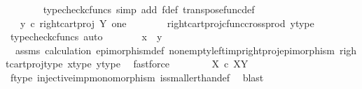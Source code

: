 \begin{isabellebody}
\ \ \ \ \ \ \isamarkupfalse%
\ {\isacharparenleft}{\kern0pt}typecheck{\isacharunderscore}{\kern0pt}cfuncs{\isacharcomma}{\kern0pt}\ simp\ add{\isacharcolon}{\kern0pt}\ f{\isacharunderscore}{\kern0pt}def\ transpose{\isacharunderscore}{\kern0pt}func{\isacharunderscore}{\kern0pt}def{\isacharparenright}{\kern0pt}\isanewline
\ \ \ \ \isamarkupfalse%
\ \isamarkupfalse%
\ {\isachardoublequoteopen}{\isachardot}{\kern0pt}{\isachardot}{\kern0pt}{\isachardot}{\kern0pt}\ {\isacharequal}{\kern0pt}\ y\ {\isasymcirc}\isactrlsub c\ {\isacharparenleft}{\kern0pt}right{\isacharunderscore}{\kern0pt}cart{\isacharunderscore}{\kern0pt}proj\ Y\ one{\isacharparenright}{\kern0pt}{\isachardoublequoteclose}\isanewline
\ \ \ \ \ \ \isamarkupfalse%
\ right{\isacharunderscore}{\kern0pt}cart{\isacharunderscore}{\kern0pt}proj{\isacharunderscore}{\kern0pt}cfunc{\isacharunderscore}{\kern0pt}cross{\isacharunderscore}{\kern0pt}prod\ y{\isacharunderscore}{\kern0pt}type{}\ \isamarkupfalse%
\ {\isacharparenleft}{\kern0pt}typecheck{\isacharunderscore}{\kern0pt}cfuncs{\isacharcomma}{\kern0pt}\ auto{\isacharparenright}{\kern0pt}\isanewline
\ \ \ \ \isamarkupfalse%
\ \isamarkupfalse%
\ {\isachardoublequoteopen}x\ {\isacharequal}{\kern0pt}\ y{\isachardoublequoteclose}\isanewline
\ \ \ \ \ \ \isamarkupfalse%
\ \ assms\ calculation\ epimorphism{\isacharunderscore}{\kern0pt}def{}\ nonempty{\isacharunderscore}{\kern0pt}left{\isacharunderscore}{\kern0pt}imp{\isacharunderscore}{\kern0pt}right{\isacharunderscore}{\kern0pt}proj{\isacharunderscore}{\kern0pt}epimorphism\ right{\isacharunderscore}{\kern0pt}cart{\isacharunderscore}{\kern0pt}proj{\isacharunderscore}{\kern0pt}type\ x{\isacharunderscore}{\kern0pt}type{}\ y{\isacharunderscore}{\kern0pt}type{}\ \isamarkupfalse%
\ fastforce\isanewline
\ \ \isamarkupfalse%
\isanewline
\ \ \isamarkupfalse%
\ \isamarkupfalse%
\ {\isachardoublequoteopen}X\ {\isasymle}\isactrlsub c\ X\isactrlbsup Y\isactrlesup {\isachardoublequoteclose}\isanewline
\ \ \ \ \isamarkupfalse%
\ f{\isacharunderscore}{\kern0pt}type\ injective{\isacharunderscore}{\kern0pt}imp{\isacharunderscore}{\kern0pt}monomorphism\ is{\isacharunderscore}{\kern0pt}smaller{\isacharunderscore}{\kern0pt}than{\isacharunderscore}{\kern0pt}def\ \isamarkupfalse%
\ blast\isanewline
{}\isamarkupfalse%
%
\endisatagproof
{\isafoldproof}%

\end{isabellebody}
